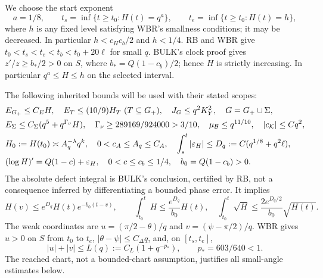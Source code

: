 \documentclass[11pt]{article}
\numberwithin{equation}{section}
\theoremstyle{remark}\newtheorem{remark}[theorem]{Remark}
\newcommand{\KK}{\mathcal K}\newcommand{\BB}{\mathcal B}
\newcommand{\Gp}{{G_+}}\newcommand{\Clk}{\mathcal C_q}
\newcommand{\eps}{\varepsilon}\newcommand{\one}{\mathbf1}
\begin{document}
We choose the start exponent
\begin{equation}
 a=1/8,\qquad t_s=\inf\{t\ge t_0:H(t)=q^a\},\qquad
 t_e=\inf\{t\ge t_0:H(t)=h\},
 \label{an03mpv1:levels}
\end{equation}
where $h$ is any fixed level satisfying WBR's smallness conditions;
it may be decreased. In particular $h<c_Hc_b/2$ and $h<1/4$.
RB and WBR give $t_0<t_s<t_e<t_b<t_0+20\ell$ for small $q$.
BULK's clock proof gives $z'/z\ge b_*/2>0$ on $S$, where
$b_*=Q(1-c_b)/2$; hence $H$ is strictly increasing. In particular
$q^a\le H\le h$ on the selected interval.

The following inherited bounds will be used with their stated scopes:
\begin{align}
 &E_\Gp\le C_EH,\quad E_T\le(10/9)H_T\ (T\subseteq\Gp),
 \quad J_G\le q^2K_Y^2,\quad G=\Gp\cup\Sigma,\notag\\
 &E_\Sigma\le C_\Sigma(q^5+q^{\Gamma_\nu}H),\quad
 \Gamma_\nu\ge289169/924000>3/10,\quad
 \mu_\BB\le q^{11/10},\quad |c_\KK|\le Cq^2,
 \label{an03mpv1:states}\\
 &H_0:=H(t_0)\asymp A_q^{-\lambda}q^k,\quad
 0<c_A\le A_q\le C_A,\quad
 \int_s^t|\eps_H|\le D_q:=C(q^{1/8}+q^2\ell),\notag\\
 & (\log H)'=Q(1-c)+\eps_H,\quad 0<c\le c_b\le1/4,
 \quad b_0=Q(1-c_b)>0.
 \label{an03mpv1:clock}
\end{align}
The absolute defect integral is BULK's conclusion, certified by RB,
not a consequence inferred by differentiating a bounded phase error.
It implies
\begin{equation}
 H(v)\le e^{D_q}H(t)e^{-b_0(t-v)},\qquad
 \int_{t_0}^t H\le\frac{e^{D_q}}{b_0}H(t),\quad
 \int_{t_0}^t\sqrt H\le\frac{2e^{D_q/2}}{b_0}\sqrt{H(t)}.
 \label{an03mpv1:backward}
\end{equation}
The weak coordinates are $u=(\pi/2-\theta)/q$ and
$v=(\psi-\pi/2)/q$. WBR gives $u>0$ on $S$ from $t_0$ to $t_e$,
$|\theta-\psi|\le C_\Delta q$, and, on $[t_s,t_e]$,
\begin{equation}
 |u|+|v|\le L(q):=C_L(1+q^{-p_*}),\qquad p_*=603/640<1.
 \label{an03mpv1:chart}
\end{equation}
The reached chart, not a bounded-chart assumption, justifies all
small-angle estimates below.
\end{document}
